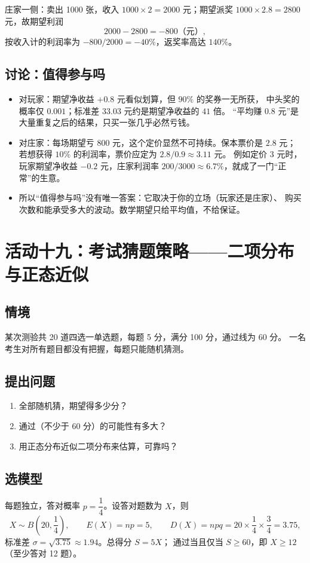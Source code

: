 庄家一侧：卖出 1000 张，收入 $1000\times2=2000$ 元；期望派奖
$1000\times2.8=2800$ 元，故期望利润
\[
  2000-2800=-800\text{（元）},
\]
按收入计的利润率为 $-800/2000=-40\%$，返奖率高达 $140\%$。

\subsection{讨论：值得参与吗}
\begin{itemize}
  \item 对玩家：期望净收益 $+0.8$ 元看似划算，但 $90\%$ 的奖券一无所获，
        中头奖的概率仅 $0.001$；标准差 $33.03$ 元约是期望净收益的 $41$ 倍。
        “平均赚 $0.8$ 元”是大量重复之后的结果，只买一张几乎必然亏钱。
  \item 对庄家：每场期望亏 800 元，这个定价显然不可持续。保本票价是 $2.8$ 元；
        若想获得 $10\%$ 的利润率，票价应定为 $2.8/0.9\approx3.11$ 元。
        例如定价 $3$ 元时，玩家期望净收益 $-0.2$ 元，庄家利润率
        $200/3000\approx6.7\%$，就成了一门“正常”的生意。
  \item 所以“值得参与吗”没有唯一答案：它取决于你的立场（玩家还是庄家）、
        购买次数和能承受多大的波动。数学期望只给平均值，不给保证。
\end{itemize}

\section{活动十九：考试猜题策略——二项分布与正态近似}

\subsection{情境}
某次测验共 20 道四选一单选题，每题 5 分，满分 100 分，通过线为 60 分。
一名考生对所有题目都没有把握，每题只能随机猜测。

\subsection{提出问题}
\begin{enumerate}
  \item 全部随机猜，期望得多少分？
  \item 通过（不少于 60 分）的可能性有多大？
  \item 用正态分布近似二项分布来估算，可靠吗？
\end{enumerate}

\subsection{选模型}
每题独立，答对概率 $p=\dfrac14$。设答对题数为 $X$，则
\[
  X\sim B\!\left(20,\frac14\right),\qquad
  E(X)=np=5,\qquad D(X)=npq=20\times\frac14\times\frac34=3.75,
\]
标准差 $\sigma=\sqrt{3.75}\approx1.94$。总得分 $S=5X$；
通过当且仅当 $S\ge60$，即 $X\ge12$（至少答对 12 题）。

